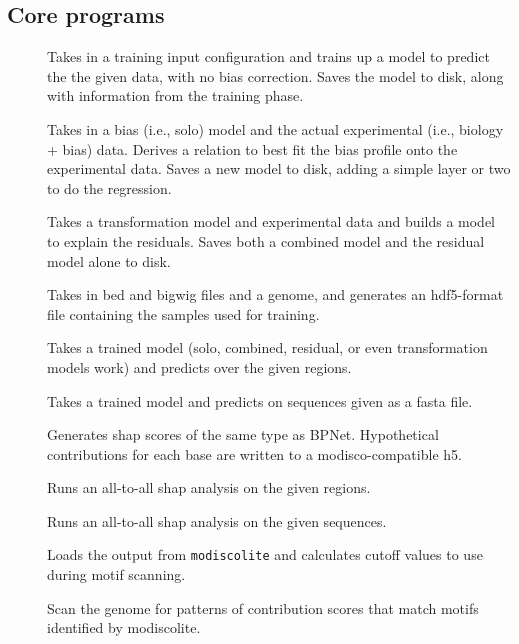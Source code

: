 \documentclass{article}
\begin{document}
\subsection{Core programs}

\begin{description}
    \item [] Takes in a training input configuration
        and trains up a model to predict the the given data, with no bias
        correction.
        Saves the model to disk, along with information from the training phase.
    \item [] Takes in a bias (i.e., solo)
        model and the actual experimental (i.e., biology + bias) data.
        Derives a relation to best fit the bias profile onto the experimental
        data.
        Saves a new model to disk, adding a simple layer or two to do the
        regression.
    \item [] Takes a transformation model and
        experimental data and builds a model to explain the residuals.
        Saves both a combined model and the residual model alone to disk.
    \item [] Takes in bed and bigwig files and a
        genome, and generates an hdf5-format file containing the samples used
        for training.
    \item [] Takes a trained model (solo, combined,
        residual, or even transformation models work) and predicts over the
        given regions.
    \item [] Takes a trained model and predicts
        on sequences given as a fasta file.
    \item [] Generates shap scores of the same type as
        BPNet.
        Hypothetical contributions for each base are written to a
        modisco-compatible h5.
    \item [] Runs an all-to-all shap analysis on the
        given regions.
    \item [] Runs an all-to-all shap analysis on
        the given sequences.
    \item [] Loads the output from
        \texttt{modiscolite} and calculates cutoff values to use during motif
        scanning.
    \item [] Scan the genome for patterns of contribution
        scores that match motifs identified by modiscolite.
\end{description}
\end{document}
